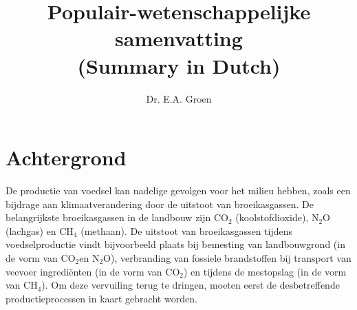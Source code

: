 \documentclass[12pt]{amsart}
\title{Populair-wetenschappelijke samenvatting \\ (Summary in Dutch)}
\author{Dr. E.A. Groen}
\date{} %
\begin{document}
\maketitle

\section{Achtergrond}
\noindent
De productie van voedsel kan nadelige gevolgen voor het milieu hebben, zoals een bijdrage aan klimaatverandering door de uitstoot van broeikasgassen. De belangrijkste broeikasgassen in de landbouw zijn CO$_2$ (koolstofdioxide), N$_2$O (lachgas) en CH$_4$ (methaan). De uitstoot van broeikasgassen tijdens voedselproductie vindt bijvoorbeeld plaats bij bemesting van landbouwgrond (in de vorm van CO$_2$en N$_2$O), verbranding van fossiele brandstoffen bij transport van veevoer ingredi\"enten (in de vorm van CO$_2$) en tijdens de mestopslag (in de vorm van CH$_4$). Om deze vervuiling terug te dringen, moeten eerst de desbetreffende productieprocessen in kaart gebracht worden.
\end{document}
